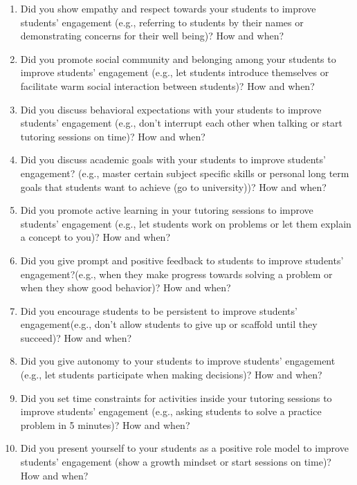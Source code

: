 \begin{enumerate}
    \item Did you show empathy and respect towards your students to improve students' engagement (e.g., referring to students by their names or demonstrating concerns for their well being)? How and when?
    \item Did you promote social community and belonging among your students to improve students' engagement (e.g., let students introduce themselves or facilitate warm social interaction between students)? How and when?
    \item Did you discuss behavioral expectations with your students to improve students' engagement (e.g., don't interrupt each other when talking or start tutoring sessions on time)? How and when?
    \item Did you discuss academic goals with your students to improve students' engagement? (e.g., master certain subject specific skills or personal long term goals that students want to achieve (go to university))? How and when?
    \item Did you promote active learning in your tutoring sessions to improve students' engagement (e.g., let students work on problems or let them explain a concept to you)? How and when?
    \item Did you give prompt and positive feedback to students to improve students' engagement?(e.g., when they make progress towards solving a problem or when they show good behavior)? How and when?
    \item Did you encourage students to be persistent to improve students' engagement(e.g., don't allow students to give up or scaffold until they succeed)? How and when?
    \item Did you give autonomy to your students to improve students' engagement (e.g., let students participate when making decisions)? How and when?
    \item Did you set time constraints for activities inside your tutoring sessions to improve students' engagement (e.g., asking students to solve a practice problem in 5 minutes)? How and when?
    \item Did you present yourself to your students as a positive role model to improve students' engagement (show a growth mindset or start sessions on time)? How and when?
\end{enumerate}
    

